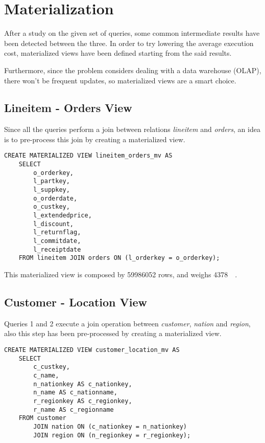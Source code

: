 

\section{Materialization}
\label{section:materialization}

After a study on the given set of queries, some common intermediate results have been detected between the three. In order to try lowering the average execution cost, materialized views have been defined starting from the said results.

Furthermore, since the problem considers dealing with a data warehouse (OLAP), there won't be frequent updates, so materialized views are a smart choice.

\subsection{Lineitem - Orders View}
Since all the queries perform a join between relations \textit{lineitem} and \textit{orders}, an idea is to pre-process this join by creating a materialized view.

\begin{lstlisting}
CREATE MATERIALIZED VIEW lineitem_orders_mv AS
	SELECT 
		o_orderkey, 
		l_partkey, 
		l_suppkey, 
		o_orderdate, 
		o_custkey, 
		l_extendedprice, 
		l_discount, 
		l_returnflag,
		l_commitdate,
		l_receiptdate
	FROM lineitem JOIN orders ON (l_orderkey = o_orderkey);
\end{lstlisting}

This materialized view is composed by \num{59986052} rows, and weighs \SI{4378}{\mega\byte}.

\subsection{Customer - Location View}
Queries 1 and 2 execute a join operation between \textit{customer}, \textit{nation} and \textit{region}, also this step has been pre-processed by creating a materialized view.

\begin{lstlisting}
CREATE MATERIALIZED VIEW customer_location_mv AS
	SELECT 
		c_custkey, 
		c_name, 
		n_nationkey AS c_nationkey, 
		n_name AS c_nationname, 
		r_regionkey AS c_regionkey, 
		r_name AS c_regionname 
	FROM customer 
		JOIN nation ON (c_nationkey = n_nationkey)
		JOIN region ON (n_regionkey = r_regionkey);
\end{lstlisting}

